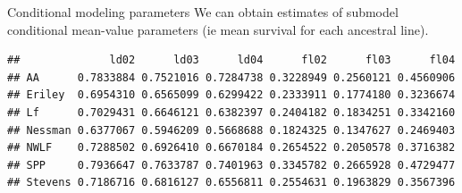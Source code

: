 \documentclass[
  ignorenonframetext,
]{beamer}
\newenvironment{Shaded}{\begin{snugshade}}{\end{snugshade}}
\newcommand{\AttributeTok}[1]{\textcolor[rgb]{0.77,0.63,0.00}{#1}}
\newcommand{\ConstantTok}[1]{\textcolor[rgb]{0.00,0.00,0.00}{#1}}
\newcommand{\DecValTok}[1]{\textcolor[rgb]{0.00,0.00,0.81}{#1}}
\newcommand{\FunctionTok}[1]{\textcolor[rgb]{0.00,0.00,0.00}{#1}}
\newcommand{\NormalTok}[1]{#1}
\newcommand{\OtherTok}[1]{\textcolor[rgb]{0.56,0.35,0.01}{#1}}
\newcommand{\SpecialCharTok}[1]{\textcolor[rgb]{0.00,0.00,0.00}{#1}}
\newcommand{\StringTok}[1]{\textcolor[rgb]{0.31,0.60,0.02}{#1}}
\begin{document}
\begin{frame}[fragile]{Conditional modeling parameters}
\protect\hypertarget{conditional-modeling-parameters}{}
We can obtain estimates of submodel conditional mean-value parameters
(ie mean survival for each ancestral line).

\vspace{12pt}
\tiny

\begin{Shaded}
\end{Shaded}

\begin{verbatim}
##              ld02      ld03      ld04      fl02      fl03      fl04
## AA      0.7833884 0.7521016 0.7284738 0.3228949 0.2560121 0.4560906
## Eriley  0.6954310 0.6565099 0.6299422 0.2333911 0.1774180 0.3236674
## Lf      0.7029431 0.6646121 0.6382397 0.2404182 0.1834251 0.3342160
## Nessman 0.6377067 0.5946209 0.5668688 0.1824325 0.1347627 0.2469403
## NWLF    0.7288502 0.6926410 0.6670184 0.2654522 0.2050578 0.3716382
## SPP     0.7936647 0.7633787 0.7401963 0.3345782 0.2665928 0.4729477
## Stevens 0.7186716 0.6816127 0.6556811 0.2554631 0.1963829 0.3567396
\end{verbatim}
\end{frame}
\end{document}
